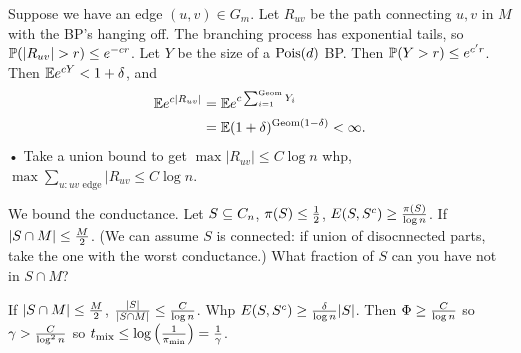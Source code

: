 Suppose we have an edge $(u,v)\in G_m$. Let $R_{uv}$ be the path connecting $u,v$ in $M$ with the BP's hanging off. The branching process has exponential tails, so $\Pj(|R_{uv}|>r) \le e^{-cr}$. 
Let $Y$ be the size of a $\operatorname{Pois}(d)$ BP. Then $\mathbb{P}(Y>r) \le e^{c'r}$. Then $\mathbb{E} e^{cY}<1+\delta$, and 
\begin{align}
\mathbb{E} e^{c|R_{uv}|}
&=\mathbb{E} e^{c\sum_{i=1}^{\text{Geom}} Y_i}\\
&= \mathbb{E} (1+\delta)^{\text{Geom}(1-\delta)}<\infty.
\end{align}•
Take a union bound to get $\max |R_{uv}|\le C\log n$ whp,  $\max \sum_{u:uv\text{ edge}} |R_{uv}\le C\log n$.

We bound the conductance. Let $S\subseteq C_n$, $\pi(S)\le \frac{1}{2}$, $E(S,S^c)\ge\frac{\pi(S)}{\log n}$. If $|S\cap M| \le \frac{M}{2}$.
(We can assume $S$ is connected: if union of disocnnected parts, take the one with the worst conductance.) What fraction of $S$ can you have not in $S\cap M$?

If $|S\cap M|\le \frac{M}{2}$, $\frac{|S|}{|S\cap M|}\le \frac{C}{\log n}$. %
Whp $E(S,S^c)\ge \frac{\delta}{\log n}|S|$. Then $\Phi\ge \frac{C}{\log n}$ so $\gamma > \frac{C}{\log^2n}$ so $t_{\text{mix}}\le \log \left( {\frac{1}{\pi_{\min}}} \right) = \frac{1}{\gamma}$.
